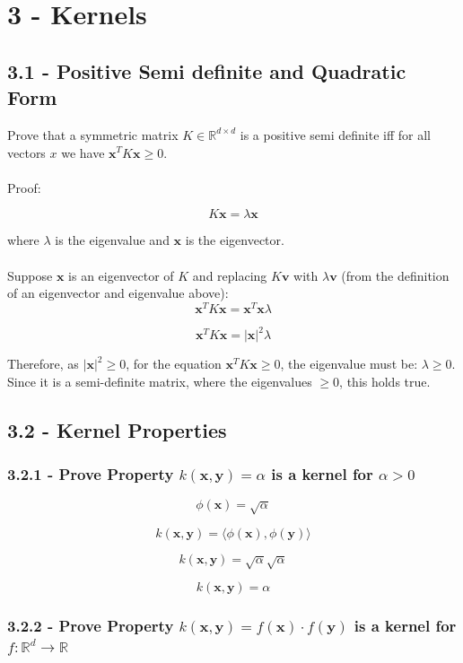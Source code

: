 \documentclass[10pt]{article}
\begin{document}
\section{3 - Kernels}
\subsection{3.1 - Positive Semi definite and Quadratic Form}

Prove that a symmetric matrix $K \in \mathbb{R}^{d \times d} $ is a positive semi definite iff for all vectors $x$ we have $\textbf{x}^{T}K\textbf{x} \geq 0$.
\\ \\
Proof: 

\[
K\textbf{x} = \lambda \textbf{x}
\]

where $\lambda$ is the eigenvalue and $\textbf{x}$ is the eigenvector. 
\\ \\
Suppose $\textbf{x}$ is an eigenvector of $K$ and replacing $K\textbf{v}$ with $\lambda \textbf{v}$ (from the definition of an eigenvector and eigenvalue above):
\[
\textbf{x}^{T}K\textbf{x} = \textbf{x}^{T} \textbf{x} \lambda
\]

\[
\textbf{x}^{T}K\textbf{x} = |\textbf{x}|^{2} \lambda
\]

Therefore, as $|\textbf{x}|^{2} \geq 0$, for the equation $\textbf{x}^{T}K\textbf{x} \geq 0$, the eigenvalue must be: $\lambda \geq 0$. Since it is a semi-definite matrix, where the eigenvalues $\geq 0$, this holds true.  


\subsection{3.2 - Kernel Properties}
\subsubsection{3.2.1 - Prove Property $k(\textbf{x},\textbf{y}) = \alpha $ is a kernel for $\alpha > 0$}

\[
\phi(\textbf{x}) = \sqrt{\alpha}
\]

\[
k(\textbf{x},\textbf{y}) = \langle \phi(\textbf{x}), \phi(\textbf{y}) \rangle
\]

\[
k(\textbf{x},\textbf{y}) = \sqrt{\alpha} \sqrt{\alpha}
\]

\[
k(\textbf{x},\textbf{y}) = \alpha
\]

\subsubsection{3.2.2 - Prove Property $k(\textbf{x},\textbf{y}) = f(\textbf{x}) \cdot f(\textbf{y}) $ is a kernel for $ f: \mathbb{R}^{d} \rightarrow \mathbb{R}$}
\end{document}

